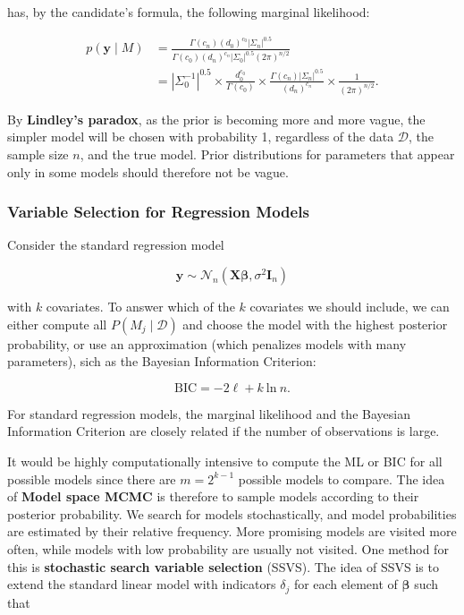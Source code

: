 has, by the candidate's formula, the following marginal likelihood:

\begin{align*}
	p(\bm{y}\mid M) &= \frac{\Gamma(c_n)(d_0)^{c_0}|\Sigma_n|^{0.5}}{\Gamma(c_0)(d_n)^{c_n}|\Sigma_0|^{0.5}(2\pi)^{n/2}} \\
	&= |\Sigma_0^{-1}|^{0.5}\times \frac{d_0^{c_0}}{\Gamma(c_0)}\times \frac{\Gamma(c_n)|\Sigma_n|^{0.5}}{(d_n)^{c_n}} \times \frac{1}{(2\pi)^{n/2}}.
\end{align*}

By \textbf{Lindley's paradox}, as the prior is becoming more and more vague, the simpler model will be chosen with probability 1, regardless of the data $\mathcal{D}$, the sample size $n$, and the true model. Prior distributions for parameters that appear only in some models should therefore not be vague.

\subsubsection{Variable Selection for Regression Models}

Consider the standard regression model 

\[
	\bm{y}\sim\mathcal{N}_n(\bm{X\beta},\sigma^2\bm{I}_n)
\]

with $k$ covariates. To answer which of the $k$ covariates we should include, we can either compute all $P(M_j\mid\mathcal{D})$ and choose the model with the highest posterior probability, or use an approximation (which penalizes models with many parameters), sich as the Bayesian Information Criterion:

\begin{equation}
	\mathrm{BIC} = -2\ell + k\:\mathrm{ln}\:n.
\end{equation}

For standard regression models, the marginal likelihood and the Bayesian Information Criterion are closely related if the number of observations is large.

It would be highly computationally intensive to compute the ML or BIC for all possible models since there are $m = 2^{k-1}$ possible models to compare. The idea of \textbf{Model space MCMC} is therefore to sample models according to their posterior probability. We search for models stochastically, and model probabilities are estimated by their relative frequency. More promising models are visited more often, while models with low probability are usually not visited. One method for this is \textbf{stochastic search variable selection} (SSVS). The idea of SSVS is to extend the standard linear model with indicators $\delta_j$ for each element of $\bm{\beta}$ such that

